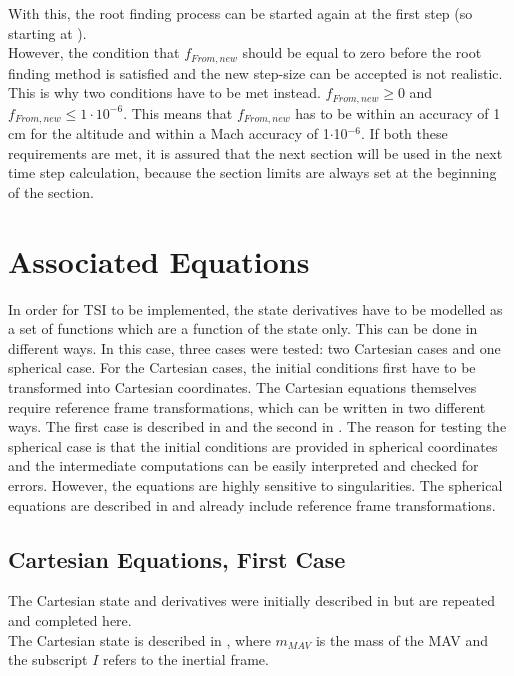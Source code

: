 \noindent
With this, the root finding process can be started again at the first step (so starting at ).\\

\noindent
However, the condition that $f_{From,new}$ should be equal to zero before the root finding method is satisfied and the new step-size can be accepted is not realistic. This is why two conditions have to be met instead. $f_{From,new}\geq 0$ and $f_{From,new}\leq 1\cdot10^{-6}$. This means that $f_{From,new}$ has to be within an accuracy of 1 cm for the altitude and within a Mach accuracy of 1$\cdot$10$^{-6}$. If both these requirements are met, it is assured that the next section will be used in the next time step calculation, because the section limits are always set at the beginning of the section.  




\section{Associated Equations}
\label{sec:assEq}
In order for \ac{TSI} to be implemented, the state derivatives have to be modelled as a set of functions which are a function of the state only. This can be done in different ways. In this case, three cases were tested: two Cartesian cases and one spherical case. For the Cartesian cases, the initial conditions first have to be transformed into Cartesian coordinates. The Cartesian equations themselves require reference frame transformations, which can be written in two different ways. The first case is described in  and the second in . The reason for testing the spherical case is that the initial conditions are provided in spherical coordinates and the intermediate computations can be easily interpreted and checked for errors. However, the equations are highly sensitive to singularities. The spherical equations are described in  and already include reference frame transformations. 

\subsection{Cartesian Equations, First Case}
\label{subsec:careq}
The Cartesian state and derivatives were initially described in  but are repeated and completed here.\\
The Cartesian state is described in , where $m_{MAV}$ is the mass of the \ac{MAV} and the subscript $I$ refers to the inertial frame.

